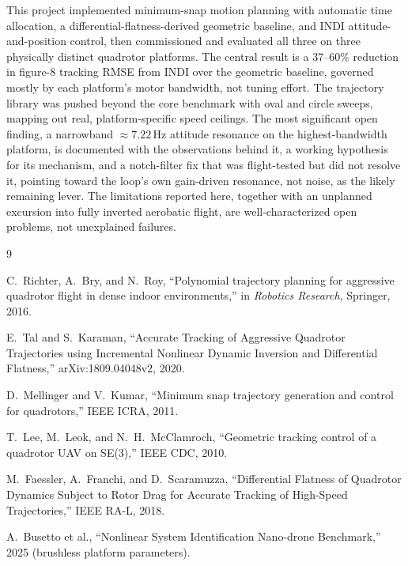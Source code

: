 \documentclass[11pt,a4paper]{article}
\begin{document}
This project implemented minimum-snap motion planning with automatic time allocation, a
differential-flatness-derived geometric baseline, and INDI attitude-and-position control, then
commissioned and evaluated all three on three physically distinct quadrotor platforms. The
central result is a 37--60\% reduction in figure-8 tracking RMSE from INDI over the geometric
baseline, governed mostly by each platform's motor bandwidth, not tuning effort. The trajectory
library was pushed beyond the core benchmark with oval and circle sweeps, mapping out real,
platform-specific speed ceilings. The most significant open finding, a narrowband
$\approx7.22$\,Hz attitude resonance on the highest-bandwidth platform, is documented with the
observations behind it, a working hypothesis for its mechanism, and a notch-filter fix that was
flight-tested but did not resolve it, pointing toward the loop's own gain-driven resonance, not
noise, as the likely remaining lever. The limitations reported here, together with an unplanned
excursion into fully inverted aerobatic flight, are well-characterized open problems, not
unexplained failures.

\begin{thebibliography}{9}

C.~Richter, A.~Bry, and N.~Roy, ``Polynomial trajectory planning for aggressive quadrotor
flight in dense indoor environments,'' in \textit{Robotics Research}, Springer, 2016.

E.~Tal and S.~Karaman, ``Accurate Tracking of Aggressive Quadrotor Trajectories using
Incremental Nonlinear Dynamic Inversion and Differential Flatness,'' arXiv:1809.04048v2, 2020.

D.~Mellinger and V.~Kumar, ``Minimum snap trajectory generation and control for quadrotors,''
IEEE ICRA, 2011.

T.~Lee, M.~Leok, and N.~H.~McClamroch, ``Geometric tracking control of a quadrotor UAV on
SE(3),'' IEEE CDC, 2010.

M.~Faessler, A.~Franchi, and D.~Scaramuzza, ``Differential Flatness of Quadrotor Dynamics
Subject to Rotor Drag for Accurate Tracking of High-Speed Trajectories,'' IEEE RA-L, 2018.

A.~Busetto et al., ``Nonlinear System Identification Nano-drone Benchmark,'' 2025 (brushless
platform parameters).

\end{thebibliography}
\end{document}
